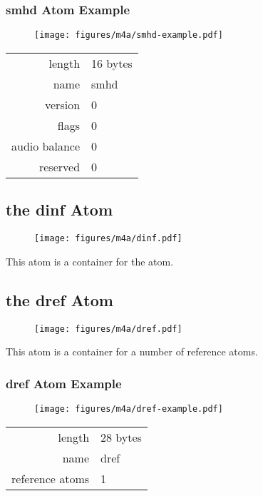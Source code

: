 \subsubsection{smhd Atom Example}
\begin{figure}[h]
  \texttt{[image: figures/m4a/smhd-example.pdf]}
\end{figure}
\begin{tabular}{rl}
  \textsf{length} & 16 bytes \\
  \textsf{name} & \textsf{smhd} \\
  \textsf{version} & 0 \\
  \textsf{flags} & 0 \\
  \textsf{audio balance} & 0 \\
  \textsf{reserved} & 0 \\
\end{tabular}

\clearpage

\subsection{the dinf Atom}
\begin{figure}[h]
  \texttt{[image: figures/m4a/dinf.pdf]}
\end{figure}
\par
\noindent
This atom is a container for the  atom.

\subsection{the dref Atom}

\begin{figure}[h]
\texttt{[image: figures/m4a/dref.pdf]}
\end{figure}
\par
\noindent
This atom is a container for a number of reference atoms.

\subsubsection{dref Atom Example}
\begin{figure}[h]
  \texttt{[image: figures/m4a/dref-example.pdf]}
\end{figure}
\begin{tabular}{rl}
  \textsf{length} & 28 bytes \\
  \textsf{name} & \textsf{dref} \\
  \textsf{reference atoms} & 1 \\
\end{tabular}

